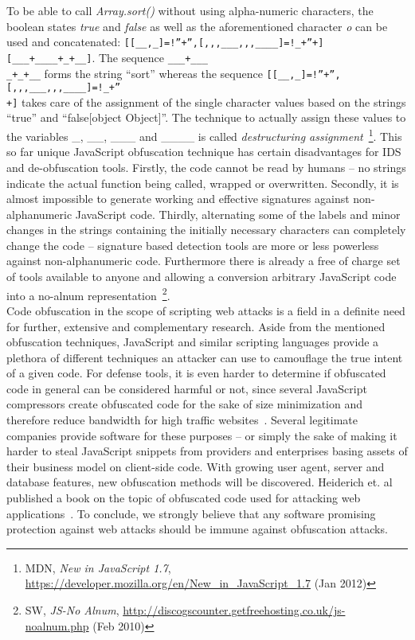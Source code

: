     To be able to call \textit{Array.sort()} without using alpha-numeric characters, the boolean states \textit{true} and \textit{false} as well as the aforementioned character \textit{o} can be used and concatenated: \texttt{[[\_\_,\_]=!''+'',[,,,\_\_\_,,,\_\_\_\_]=!\_+''+{}][\_\_\_+\_\_\_\_+\_+\_\_]}.
    The sequence \texttt{\_\_\_+\_\_\_\\
\_+\_+\_\_} forms the string ``sort'' whereas the sequence \texttt{[[\_\_,\_]=!''+'',[,,,\_\_\_,,,\_\_\_\_]=!\_+''\\
+{}]} takes care of the assignment of the single character values based on the strings ``true'' and ``false[object Object]''. The technique to actually assign these values to the variables \_, \_\_, \_\_\_ and \_\_\_\_ is called \textit{destructuring assignment}~\footnote{MDN, \textit{New in JavaScript 1.7}, \url{https://developer.mozilla.org/en/New_in_JavaScript_1.7} (Jan 2012)}. This so far unique JavaScript obfuscation technique has certain disadvantages for IDS and de-obfuscation tools. Firstly, the code cannot be read by humans -- no strings indicate the actual function being called, wrapped or overwritten. Secondly, it is almost impossible to generate working and effective signatures against non-alphanumeric JavaScript code. Thirdly, alternating some of the labels and minor changes in the strings containing the initially necessary characters can completely change the code -- signature based detection tools are more or less powerless against non-alphanumeric code. Furthermore there is already a free of 
charge set of tools available to anyone and allowing a conversion arbitrary JavaScript code into a no-alnum representation~\footnote{SW, \textit{JS-No Alnum}, \url{http://discogscounter.getfreehosting.co.uk/js-noalnum.php} (Feb 2010)}.\\

    Code obfuscation in the scope of scripting web attacks is a field in a definite need for further, extensive and complementary research. Aside from the mentioned obfuscation techniques, JavaScript and similar scripting languages provide a plethora of different techniques an attacker can use to camouflage the true intent of a given code. For defense tools, it is even harder to determine if obfuscated code in general can be considered harmful or not, since several JavaScript compressors create obfuscated code for the sake of size minimization and therefore reduce bandwidth for high traffic websites~\cite{kaplan2011nofus}. 
    Several legitimate companies provide software for these purposes -- or simply the sake of making it harder to steal JavaScript snippets from providers and enterprises basing assets of their business model on client-side code. With growing user agent, server and database features, new obfuscation methods will be discovered. Heiderich et. al published a book on the topic of obfuscated code used for attacking web applications~\cite{heiderich_web_2010}. To conclude, we strongly believe that any software promising protection against web attacks should be immune against obfuscation attacks.

